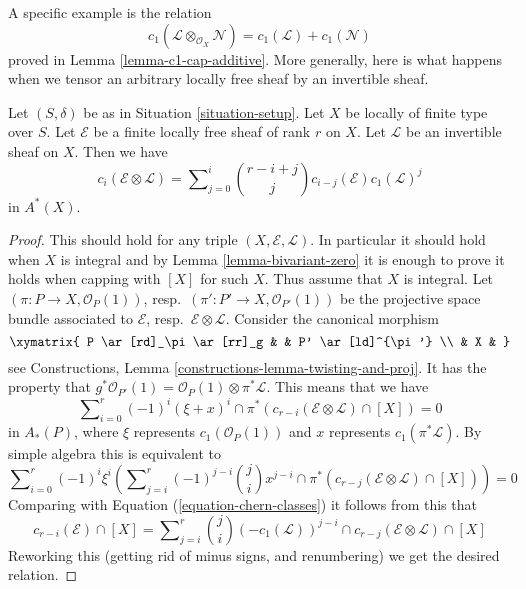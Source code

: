 \medskip\noindent
A specific example is the relation
$$
c_1(\mathcal{L} \otimes_{\mathcal{O}_X} \mathcal{N})
=
c_1(\mathcal{L}) + c_1(\mathcal{N})
$$
proved in Lemma \ref{lemma-c1-cap-additive}.
More generally, here is what happens when we tensor an
arbitrary locally free sheaf by an invertible sheaf.

\begin{lemma}
\label{lemma-chern-classes-E-tensor-L}
Let $(S, \delta)$ be as in Situation \ref{situation-setup}.
Let $X$ be locally of finite type over $S$.
Let $\mathcal{E}$ be a finite locally free sheaf of
rank $r$ on $X$. Let $\mathcal{L}$ be an invertible
sheaf on $X$. Then we have
\begin{equation}
\label{equation-twist}
c_i({\mathcal E} \otimes {\mathcal L})
=
\sum\nolimits_{j = 0}^i
\binom{r - i + j}{j} c_{i - j}({\mathcal E}) c_1({\mathcal L})^j
\end{equation}
in $A^*(X)$.
\end{lemma}

\begin{proof}
This should hold for any triple $(X, \mathcal{E}, \mathcal{L})$.
In particular it should hold when $X$ is integral and by
Lemma \ref{lemma-bivariant-zero}
it is enough to prove
it holds when capping with $[X]$ for such $X$. Thus assume
that $X$ is integral. Let $(\pi : P \to X, \mathcal{O}_P(1))$,
resp.\ $(\pi' : P' \to X, \mathcal{O}_{P'}(1))$ be the
projective space bundle associated to $\mathcal{E}$,
resp.\ $\mathcal{E} \otimes \mathcal{L}$. Consider the canonical morphism
$$
\xymatrix{
P \ar[rd]_\pi \ar[rr]_g & & P' \ar[ld]^{\pi'} \\
& X &
}
$$
see Constructions, Lemma \ref{constructions-lemma-twisting-and-proj}.
It has the property that
$g^*\mathcal{O}_{P'}(1)
= \mathcal{O}_P(1) \otimes \pi^* {\mathcal L}$.
This means that we have
$$
\sum\nolimits_{i = 0}^r
(-1)^i
(\xi + x)^i \cap \pi^*(c_{r - i}(\mathcal{E} \otimes \mathcal{L}) \cap [X])
=
0
$$
in $A_*(P)$, where $\xi$ represents
$c_1(\mathcal{O}_P(1))$ and $x$
represents $c_1(\pi^*\mathcal{L})$. By simple algebra this
is equivalent to
$$
\sum\nolimits_{i = 0}^r
(-1)^i \xi^i \left(
\sum\nolimits_{j = i}^r
(-1)^{j - i}
\binom{j}{i}
x^{j - i} \cap
\pi^*(c_{r - j}(\mathcal{E} \otimes \mathcal{L}) \cap [X])
\right)
=
0
$$
Comparing with
Equation (\ref{equation-chern-classes}) it follows from this that
$$
c_{r - i}(\mathcal{E}) \cap [X] =
\sum\nolimits_{j = i}^r
\binom{j}{i}
(-c_1(\mathcal{L}))^{j - i} \cap
c_{r - j}(\mathcal{E} \otimes \mathcal{L}) \cap [X]
$$
Reworking this (getting rid of minus signs, and renumbering) we get
the desired relation.
\end{proof}

